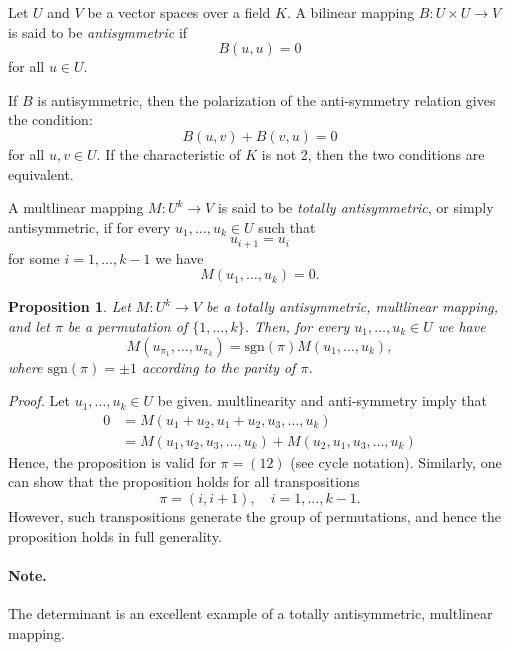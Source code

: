 \documentclass[12pt]{article}
\newtheorem{proposition}{Proposition}
\begin{document}
Let $U$ and $V$ be a vector spaces over a field $K$.  A bilinear mapping
$B:U\times U\rightarrow V$
is said to be \emph{antisymmetric} if
\begin{equation}
B(u,u)=0  
\end{equation}
for all $u\in U$.  

If $B$ is antisymmetric, then the polarization of the anti-symmetry
relation gives the condition:
\begin{equation}
B(u,v) + B(v,u) = 0  
\end{equation}
for all $u,v \in U$.  If the characteristic of $K$ is not 2, then
the two conditions are equivalent.

A multlinear mapping $M:U^k\rightarrow V$
is said to be \emph{totally antisymmetric}, or simply antisymmetric, if 
for every $u_1,\ldots,u_k\in U$ such that
$$u_{i+1} = u_i$$
for some $i=1,\ldots,k-1$ we have
$$M(u_1,\ldots,u_k)=0.$$
\begin{proposition}
  Let $M:U^k\rightarrow V$ be a totally antisymmetric, multlinear
  mapping, and let $\pi$ be a permutation of $\{1,\ldots,k\}$.  Then,
  for every $u_1,\ldots,u_k\in U$ we have
  $$M(u_{\pi_1},\ldots,u_{\pi_k}) = \mathrm{sgn}(\pi)
  M(u_1,\ldots,u_k),$$
  where $\mathrm{sgn}(\pi)=\pm1$ according to the parity of $\pi$.
\end{proposition}
{\em Proof.}
Let $u_1,\ldots,u_k\in U$ be given.  multlinearity and anti-symmetry
imply that
\begin{align*}
0 &= M(u_1+u_2,u_1+u_2,u_3,\ldots,u_k) \\
&= M(u_1,u_2,u_3,\ldots,u_k) + M(u_2,u_1,u_3,\ldots,u_k)  
\end{align*}
Hence, the proposition is valid for $\pi=(12)$ (see cycle notation).
Similarly, one can show that the proposition holds for all
transpositions 
$$\pi=(i,i+1),\quad i=1,\ldots,k-1.$$
However, such transpositions
generate the group of permutations, and hence the proposition holds in
full generality.

\paragraph{Note.} The determinant is an excellent example of a totally
antisymmetric, multlinear mapping.
\end{document}
